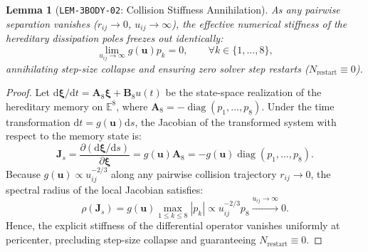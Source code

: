 \documentclass[11pt,a4paper,reqno]{article}
\theoremstyle{plain}
\newtheorem{lemma}[theorem]{Lemma}
\theoremstyle{definition}
\theoremstyle{remark}
\numberwithin{equation}{section}
\providecommand{\diff}{\mathrm{d}}
\DeclareMathOperator{\diag}{diag}
\begin{document}
\begin{lemma}[\texttt{LEM-3BODY-02}: Collision Stiffness Annihilation]
\label{lem:collision_stiffness_annihilation}
As any pairwise separation vanishes ($r_{ij} \to 0$, $u_{ij} \to \infty$), the effective numerical stiffness of the hereditary dissipation poles freezes out identically:
\begin{equation}
  \lim_{u_{ij} \to \infty} g(\mathbf{u}) p_k = 0, \qquad \forall k \in \{1, \dots, 8\},
\end{equation}
annihilating step-size collapse and ensuring zero solver step restarts ($N_{\mathrm{restart}} \equiv 0$).
\end{lemma}

\begin{proof}
Let $\diff \bm{\xi}/\diff t = \mathbf{A}_8 \bm{\xi} + \mathbf{B}_8 u(t)$ be the state-space realization of the hereditary memory on $\mathbb{E}^8$, where $\mathbf{A}_8 = -\diag(p_1, \dots, p_8)$. 
Under the time transformation $\diff t = g(\mathbf{u}) \diff s$, the Jacobian of the transformed system with respect to the memory state is:
\begin{equation}
  \mathbf{J}_s = \frac{\partial (\diff \bm{\xi}/\diff s)}{\partial \bm{\xi}} = g(\mathbf{u}) \mathbf{A}_8 = - g(\mathbf{u}) \diag(p_1, \dots, p_8).
\end{equation}
Because $g(\mathbf{u}) \propto u_{ij}^{-2/3}$ along any pairwise collision trajectory $r_{ij} \to 0$, the spectral radius of the local Jacobian satisfies:
\begin{equation}
  \rho(\mathbf{J}_s) = g(\mathbf{u}) \max_{1 \le k \le 8} |p_k| \propto u_{ij}^{-2/3} p_8 \xrightarrow{u_{ij} \to \infty} 0.
\end{equation}
Hence, the explicit stiffness of the differential operator vanishes uniformly at pericenter, precluding step-size collapse and guaranteeing $N_{\mathrm{restart}} \equiv 0$.
\end{proof}
\end{document}
